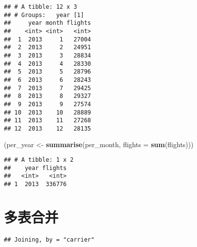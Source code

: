 \documentclass[
]{article}
\newenvironment{Shaded}{\begin{snugshade}}{\end{snugshade}}
\newcommand{\DataTypeTok}[1]{\textcolor[rgb]{0.13,0.29,0.53}{#1}}
\newcommand{\KeywordTok}[1]{\textcolor[rgb]{0.13,0.29,0.53}{\textbf{#1}}}
\newcommand{\NormalTok}[1]{#1}
\newcommand{\OperatorTok}[1]{\textcolor[rgb]{0.81,0.36,0.00}{\textbf{#1}}}
\newcommand{\StringTok}[1]{\textcolor[rgb]{0.31,0.60,0.02}{#1}}
\begin{document}
\begin{verbatim}
## # A tibble: 12 x 3
## # Groups:   year [1]
##     year month flights
##    <int> <int>   <int>
##  1  2013     1   27004
##  2  2013     2   24951
##  3  2013     3   28834
##  4  2013     4   28330
##  5  2013     5   28796
##  6  2013     6   28243
##  7  2013     7   29425
##  8  2013     8   29327
##  9  2013     9   27574
## 10  2013    10   28889
## 11  2013    11   27268
## 12  2013    12   28135
\end{verbatim}

\begin{Shaded}
\begin{Highlighting}[]
\NormalTok{(per_year  <-}\StringTok{ }\KeywordTok{summarise}\NormalTok{(per_month, }\DataTypeTok{flights =} \KeywordTok{sum}\NormalTok{(flights)))}
\end{Highlighting}
\end{Shaded}

\begin{verbatim}
## # A tibble: 1 x 2
##    year flights
##   <int>   <int>
## 1  2013  336776
\end{verbatim}

\hypertarget{ux591aux8868ux5408ux5e76}{%
\section{多表合并}\label{ux591aux8868ux5408ux5e76}}

\begin{Shaded}
\end{Shaded}

\begin{verbatim}
## Joining, by = "carrier"
\end{verbatim}
\end{document}

